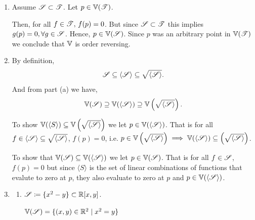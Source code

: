 \documentclass[Notebook.tex]{subfiles}
\begin{document}
\begin{solution}
    \bbni
	\begin{enumerate}[label=(\alph*), ref=\theenumi\alph*]
        \item Assume $\operatorname{\mathscr S} \subset \operatorname{\mathscr T}$. Let $p \in \mathbb V(\operatorname{\mathscr T})$. 
        
        Then, for all $f \in \operatorname{\mathscr T}, \, f(p) = 0$. But since $\operatorname{\mathscr S} \subset \operatorname{\mathscr T}$ this implies $g(p) = 0, \forall g \in \operatorname{\mathscr S}$. Hence, $p \in \mathbb V(\operatorname{\mathscr S})$. Since $p$ was an arbitrary point in $\mathbb V(\operatorname{\mathscr T})$ we conclude that $\mathbb V$ is order reversing.

        \item By definition, 
        \[\operatorname{\mathscr S} \subseteq \langle \operatorname{\mathscr S} \rangle \subseteq \sqrt{\langle \operatorname{\mathscr S} \rangle}.\]
        And from part (a) we have, 
        \[\mathbb V(\operatorname{\mathscr S}) \supseteq \mathbb V(\langle \operatorname{\mathscr S} \rangle) \supseteq \mathbb V\left (\sqrt{\langle \operatorname{\mathscr S} \rangle}\right).\]

        To show $\mathbb V(\langle S \rangle) \subseteq \mathbb V\left (\sqrt{\langle \operatorname{\mathscr S} \rangle}\right )$ we let $p \in \mathbb V(\langle \operatorname{\mathscr S} \rangle)$. That is for all $f \in \langle \operatorname{\mathscr S} \rangle \subseteq \sqrt{\langle \operatorname{\mathscr S} \rangle}$, $f(p) = 0$, i.e. $p \in \mathbb V\left (\sqrt{\langle \operatorname{\mathscr S} \rangle}\right ) \implies \mathbb V(\langle \operatorname{\mathscr S} \rangle) \subseteq \left (\sqrt{\langle \operatorname{\mathscr S} \rangle}\right )$. 

        To show that $\mathbb V(\operatorname{\mathscr S}) \subseteq \mathbb V(\langle \operatorname{\mathscr S} \rangle)$ we let $p \in \mathbb V(\operatorname{\mathscr S})$. That is for all $f \in \operatorname{\mathscr S}$, $f(p) = 0$ but since $\langle S \rangle$ is the set of linear combinations of functions that evalute to zero at $p$, they also evaluate to zero at $p$ and $p \in \mathbb V(\langle \operatorname{\mathscr S} \rangle)$. 

        \item 
        \begin{enumerate}[label=(\roman*), ref=\theenumi\roman*]
            \item $\operatorname{\mathscr S} \coloneqq \{x^2 - y\} \subset \mathbb R[x,y]$.
            
            \begin{minipage}{0.5\textwidth}
            $\mathbb V(\operatorname{\mathscr S}) = \{(x,y) \in \mathbb R^2 \mid x^2 = y\}$
            \end{minipage}
            \begin{minipage}{0.5\textwidth}
            \end{minipage}
            


\end{enumerate}
\end{enumerate}
\end{solution}
\end{document}
